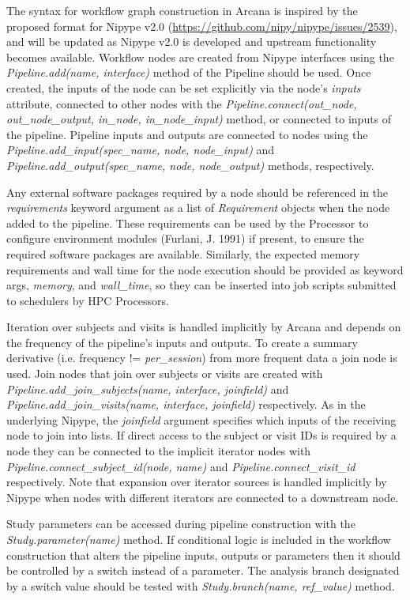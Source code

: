 The syntax for workflow graph construction in Arcana is inspired by the
proposed format for Nipype v2.0
(\href{https://github.com/nipy/nipype/issues/2539}{https://github.com/nipy/nipype/issues/2539}),
and will be updated as Nipype v2.0 is developed and upstream
functionality becomes available. Workflow nodes are created from Nipype
interfaces using the \emph{Pipeline.add(name, interface)} method of the
Pipeline should be used. Once created, the inputs of the node can be set
explicitly via the node's \emph{inputs} attribute, connected to other
nodes with the \emph{Pipeline.connect(out\_node, out\_node\_output,
in\_node, in\_node\_input)} method, or connected to inputs of the
pipeline. Pipeline inputs and outputs are connected to nodes using the
\emph{Pipeline.add\_input(spec\_name, node, node\_input)} and
\emph{Pipeline.add\_output(spec\_name, node, node\_output)} methods,
respectively.

Any external software packages required by a node should be referenced
in the \emph{requirements} keyword argument as a list of
\emph{Requirement} objects when the node added to the pipeline. These
requirements can be used by the Processor to configure environment
modules (Furlani, J. 1991) if present, to ensure the required software
packages are available. Similarly, the expected memory requirements and
wall time for the node execution should be provided as keyword args,
\emph{memory}, and \emph{wall\_time}, so they can be inserted into job
scripts submitted to schedulers by HPC Processors.

Iteration over subjects and visits is handled implicitly by Arcana and
depends on the frequency of the pipeline's inputs and outputs. To create
a summary derivative (i.e. frequency != \emph{per\_session}) from more
frequent data a join node is used. Join nodes that join over subjects or
visits are created with \emph{Pipeline.add}\_\emph{join\_subjects(name,
interface, joinfield)} and \emph{Pipeline.add\_join\_visits(name,
interface, joinfield)} respectively. As in the underlying Nipype, the
\emph{joinfield} argument specifies which inputs of the receiving node
to join into lists. If direct access to the subject or visit IDs is
required by a node they can be connected to the implicit iterator nodes
with \emph{Pipeline.connect\_subject\_id(node, name)} and
\emph{Pipeline.connect\_visit\_id} respectively. Note that expansion
over iterator sources is handled implicitly by Nipype when nodes with
different iterators are connected to a downstream node.

Study parameters can be accessed during pipeline construction with the
\emph{Study.parameter(name)} method. If conditional logic is included in
the workflow construction that alters the pipeline inputs, outputs or
parameters then it should be controlled by a switch instead of a
parameter. The analysis branch designated by a switch value should be
tested with \emph{Study.branch(name, ref\_value)} method.

